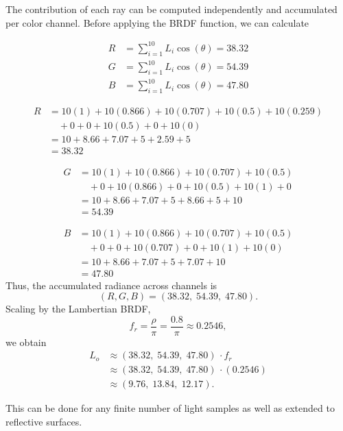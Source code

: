 \documentclass[12pt]{article}
\begin{document}
\newpage
The contribution of each ray can be computed independently and accumulated per color channel. Before applying the BRDF function, we can calculate

\[
\begin{aligned}
R &= \sum_{i=1}^{10} L_i \cos(\theta) = 38.32 \\
G &= \sum_{i=1}^{10} L_i \cos(\theta) = 54.39 \\
B &= \sum_{i=1}^{10} L_i \cos(\theta) = 47.80
\end{aligned}
\]


\begin{align*}
R &= 10(1) + 10(0.866) + 10(0.707) + 10(0.5) + 10(0.259) \\
  &\quad + 0 + 0 + 10(0.5) + 0 + 10(0) \\
  &= 10 + 8.66 + 7.07 + 5 + 2.59 + 5 \\
  &= 38.32
\end{align*}

\begin{align*}
G &= 10(1) + 10(0.866) + 10(0.707) + 10(0.5) \\
  &\quad + 0 + 10(0.866) + 0 + 10(0.5) + 10(1) + 0 \\
  &= 10 + 8.66 + 7.07 + 5 + 8.66 + 5 + 10 \\
  &= 54.39
\end{align*}

\begin{align*}
B &= 10(1) + 10(0.866) + 10(0.707) + 10(0.5) \\
  &\quad + 0 + 0 + 10(0.707) + 0 + 10(1) + 10(0) \\
  &= 10 + 8.66 + 7.07 + 5 + 7.07 + 10 \\
  &= 47.80
\end{align*}
Thus, the accumulated radiance across channels is
\[
(R, G, B) = (38.32,\; 54.39,\; 47.80).
\]
Scaling by the Lambertian BRDF,
\[
f_r = \frac{\rho}{\pi} = \frac{0.8}{\pi} \approx 0.2546,
\]
we obtain
\begin{align*}
L_o
& \approx (38.32,\; 54.39,\; 47.80)\, \cdot f_r \\
& \approx (38.32,\; 54.39,\; 47.80)\,\cdot(0.2546) \\
&\approx (9.76,\; 13.84,\; 12.17).
\end{align*}

This can be done for any finite number of light samples as well as extended to reflective surfaces.
\newline
\end{document}
